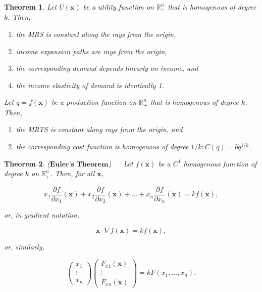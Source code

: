 \documentclass{article}
\newtheorem{theorem}{Theorem}
\theoremstyle{definition}
\theoremstyle{Solution}
\begin{document}
\begin{theorem}
 Let $U(\textbf{x})$ be a utility function on $\mathbb{R}^n_+$ that is homogenous of degree $k$. Then,
\begin{enumerate}
	\item the MRS is constant along the rays from the origin,
	\item income expansion paths are rays from the origin,
	\item the corresponding demand depends linearly on income, and
	\item the income elasticity of demand is identically 1.
\end{enumerate}
Let $q=f(\textbf{x})$ be a production function on $\mathbb{R}^n_+$ that is homogenous of degree $k$. Then, 
\begin{enumerate}
	\item the MRTS is constant along rays from the origin, and
	\item the corresponding cost function is homogenous of degree $1/k: C(q)=bq^{1/k}$.
\end{enumerate}
\end{theorem}

\begin{theorem} ($\textbf{Euler's Theorem}$) $\quad$ Let $f(\textbf{x})$ be a $C^1$ homogenous function of degree $k$ on $\mathbb{R}^n_+$. Then, for all $\textbf{x}$, 

\begin{equation}
	x_1\frac{\partial f}{\partial x_1}(\textbf{x})+x_2\frac{\partial f}{\partial x_2}(\textbf{x})+...+x_n\frac{\partial f}{\partial x_n}(\textbf{x})=kf(\textbf{x}),
\end{equation}

or, in gradient notation,

\begin{equation}
	\textbf{x} \cdot \nabla f(\textbf{x})=kf(\textbf{x}),
\end{equation}

or, similarly,

\begin{equation}
	\begin{pmatrix}
		x_1\\
		\vdots\\
		x_n
	\end{pmatrix}
	\begin{pmatrix}
		F_{x1}(\textbf{x})\\
		\vdots\\
		F_{xn}(\textbf{x})
	\end{pmatrix}
	=
	kF(x_1,\ldots,x_n).
\end{equation}
\end{theorem}
\end{document}
